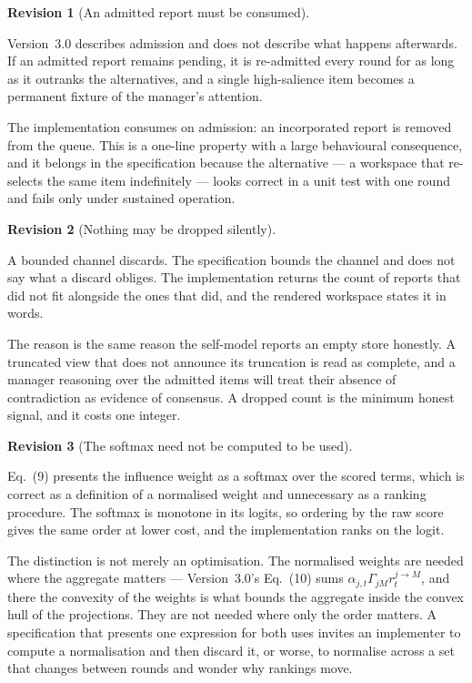 \documentclass[11pt]{article}
\newtheorem{revision}{Revision}
\begin{document}
\begin{revision}[An admitted report must be consumed]
\label{rev:consume}
\end{revision}

\noindent Version~3.0 describes admission and does not describe what happens afterwards. If an admitted report remains pending, it is re-admitted every round for as long as it outranks the alternatives, and a single high-salience item becomes a permanent fixture of the manager's attention.

The implementation consumes on admission: an incorporated report is removed from the queue. This is a one-line property with a large behavioural consequence, and it belongs in the specification because the alternative --- a workspace that re-selects the same item indefinitely --- looks correct in a unit test with one round and fails only under sustained operation.

\begin{revision}[Nothing may be dropped silently]
\label{rev:dropped}
\end{revision}

\noindent A bounded channel discards. The specification bounds the channel and does not say what a discard obliges. The implementation returns the count of reports that did not fit alongside the ones that did, and the rendered workspace states it in words.

The reason is the same reason the self-model reports an empty store honestly. A truncated view that does not announce its truncation is read as complete, and a manager reasoning over the admitted items will treat their absence of contradiction as evidence of consensus. A dropped count is the minimum honest signal, and it costs one integer.

\begin{revision}[The softmax need not be computed to be used]
\label{rev:softmax}
\end{revision}

\noindent Eq.~(9) presents the influence weight as a softmax over the scored terms, which is correct as a definition of a normalised weight and unnecessary as a ranking procedure. The softmax is monotone in its logits, so ordering by the raw score gives the same order at lower cost, and the implementation ranks on the logit.

The distinction is not merely an optimisation. The normalised weights are needed where the aggregate matters --- Version~3.0's Eq.~(10) sums $\alpha_{j,t}\Gamma_{jM}r^{j\to M}_t$, and there the convexity of the weights is what bounds the aggregate inside the convex hull of the projections. They are not needed where only the order matters. A specification that presents one expression for both uses invites an implementer to compute a normalisation and then discard it, or worse, to normalise across a set that changes between rounds and wonder why rankings move.
\end{document}
